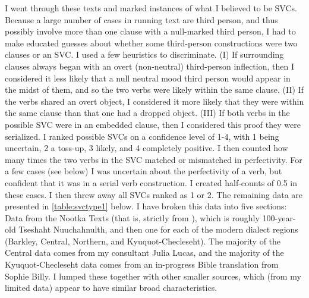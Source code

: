 I went through these texts and marked instances of what I believed to be SVCs. Because a large number of cases in running text are third person, and thus possibly involve more than one clause with a null-marked third person, I had to make educated guesses about whether some third-person constructions were two clauses or an SVC. I used a few heuristics to discriminate. (I) If surrounding clauses always began with an overt (non-neutral) third-person inflection, then I considered it less likely that a null neutral mood third person would appear in the midst of them, and so the two verbs were likely within the same clause. (II) If the verbs shared an overt object, I considered it more likely that they were within the same clause than that one had a dropped object. (III) If both verbs in the possible SVC were in an embedded clause, then I considered this proof they were serialized. I ranked possible SVCs on a confidence level of 1-4, with 1 being uncertain, 2 a toss-up, 3 likely, and 4 completely positive. I then counted how many times the two verbs in the SVC matched or mismatched in perfectivity. For a few cases (see below) I was uncertain about the perfectivity of a verb, but confident that it was in a serial verb construction. I created half-counts of 0.5 in these cases. I then threw away all SVCs ranked as 1 or 2. The remaining data are presented in \cref{table:svctype1} below. I have broken this data into five sections: Data from the Nootka Texts (that is, strictly from \citealt{sapir1939}), which is roughly 100-year-old Tseshaht Nuuchahnulth, and then one for each of the modern dialect regions (Barkley, Central, Northern, and Kyuquot-Checleseht). The majority of the Central data comes from my consultant Julia Lucas, and the majority of the Kyuquot-Checleseht data comes from an in-progress Bible translation from Sophie Billy. I lumped these together with other smaller sources, which (from my limited data) appear to have similar broad characteristics.

\vspace{-10pt}

